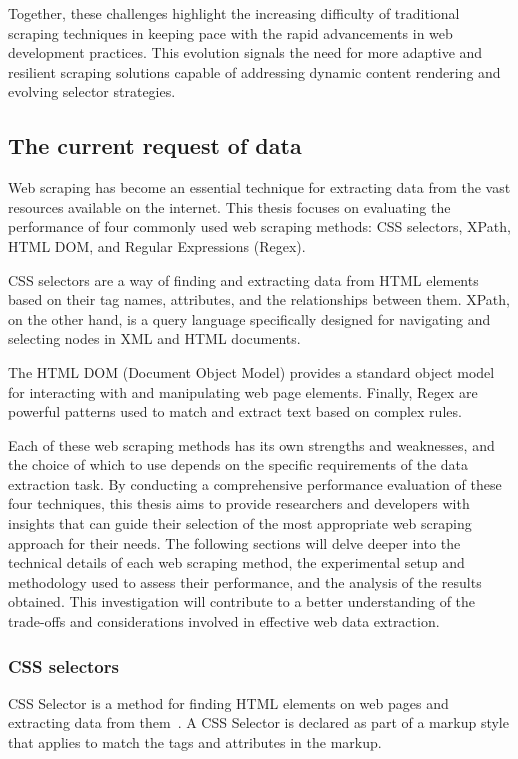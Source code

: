 Together, these challenges highlight the increasing difficulty of traditional scraping techniques in keeping pace with the rapid advancements in web development practices. This evolution signals the need for more adaptive and resilient scraping solutions capable of addressing dynamic content rendering and evolving selector strategies.

\subsection{The current request of data}
Web scraping has become an essential technique for extracting data from the vast resources available on the internet. This thesis focuses on evaluating the performance of four commonly used web scraping methods: CSS selectors, XPath, HTML DOM, and Regular Expressions (Regex).

CSS selectors are a way of finding and extracting data from HTML elements based on their tag names, attributes, and the relationships between them. XPath, on the other hand, is a query language specifically designed for navigating and selecting nodes in XML and HTML documents. 

The HTML DOM (Document Object Model) provides a standard object model for interacting with and manipulating web page elements. Finally, Regex are powerful patterns used to match and extract text based on complex rules.

Each of these web scraping methods has its own strengths and weaknesses, and the choice of which to use depends on the specific requirements of the data extraction task. By conducting a comprehensive performance evaluation of these four techniques, this thesis aims to provide researchers and developers with insights that can guide their selection of the most appropriate web scraping approach for their needs.
The following sections will delve deeper into the technical details of each web scraping method, the experimental setup and methodology used to assess their performance, and the analysis of the results obtained. This investigation will contribute to a better understanding of the trade-offs and considerations involved in effective web data extraction.
\subsubsection{CSS selectors}
CSS Selector is a method for finding HTML elements on web pages and extracting data from them~\cite{darmawan2022evaluating}. A CSS Selector is declared as part of a markup style that applies to match the tags and attributes in the markup.
